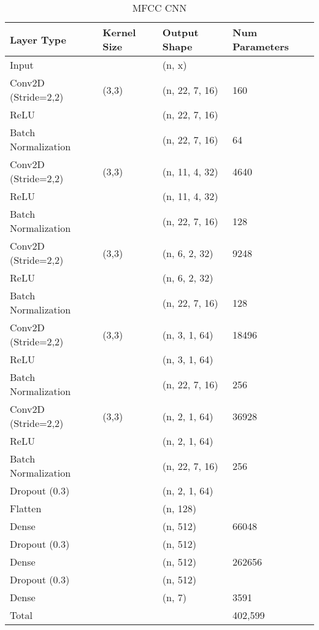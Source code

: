 \begin{table}[ht]
\caption{MFCC CNN}
\centering
\begin{tabular}{l|l|l|l}
Layer Type & Kernel Size & Output Shape & Num Parameters \\ \hline
Input & \ & (n, x) & \\
Conv2D (Stride=2,2) & (3,3) & (n, 22, 7, 16) & 160\\
ReLU                &       & (n, 22, 7, 16) & \\
Batch Normalization &       & (n, 22, 7, 16) & 64 \\
Conv2D (Stride=2,2) & (3,3) & (n, 11, 4, 32) & 4640\\
ReLU                &       & (n, 11, 4, 32) & \\
Batch Normalization &       & (n, 22, 7, 16) & 128 \\
Conv2D (Stride=2,2) & (3,3) & (n, 6, 2, 32) & 9248\\
ReLU                &       & (n, 6, 2, 32) & \\
Batch Normalization &       & (n, 22, 7, 16) & 128 \\
Conv2D (Stride=2,2) & (3,3) & (n, 3, 1, 64) & 18496\\
ReLU                &       & (n, 3, 1, 64) & \\
Batch Normalization &       & (n, 22, 7, 16) & 256 \\
Conv2D (Stride=2,2) & (3,3) & (n, 2, 1, 64) & 36928\\
ReLU                &       & (n, 2, 1, 64) & \\
Batch Normalization &       & (n, 22, 7, 16) & 256 \\
Dropout (0.3)       &       & (n, 2, 1, 64) & \\
Flatten             &       & (n, 128) & \\
Dense 				& 		& (n, 512) & 66048\\
Dropout (0.3) 		& 		& (n, 512)  & \\
Dense 				& 		& (n, 512) & 262656\\
Dropout (0.3) 		& 		& (n, 512)  & \\
Dense               &       & (n, 7) & 3591\\
\hline
\hline
Total               &       &        & 402,599\\
\end{tabular}
\end{table}


